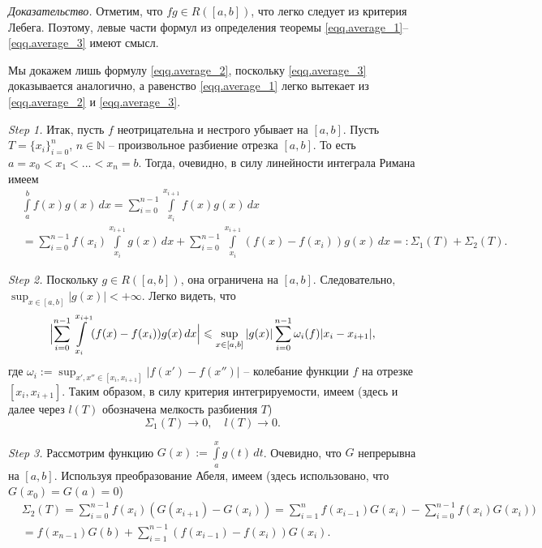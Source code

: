 \textit{Доказательство.} Отметим, что $fg \in R([a,b])$, что легко следует из критерия Лебега. Поэтому, левые части формул из определения теоремы \eqref{eqq.average_1}--\eqref{eqq.average_3} имеют смысл.
    
Мы докажем лишь формулу \eqref{eqq.average_2}, поскольку \eqref{eqq.average_3} доказывается аналогично, а равенство \eqref{eqq.average_1} легко 
вытекает из \eqref{eqq.average_2} и \eqref{eqq.average_3}.

\textit{Step 1.}
Итак, пусть $f$ неотрицательна и нестрого убывает на $[a,b]$. Пусть $T=\{x_{i}\}_{i=0}^{n}$, $n \in \mathbb{N}$ -- произвольное разбиение отрезка $[a,b]$. То есть
$a=x_{0} < x_{1} < ... < x_{n} =b$. Тогда, очевидно, в силу линейности интеграла Римана имеем
\begin{equation}
\begin{split}
\label{eqq.13}
&\int\limits_{a}^{b}f(x)g(x)\,dx = \sum\limits_{i=0}^{n-1}\int\limits_{x_{i}}^{x_{i+1}}f(x)g(x)\,dx\\
&= \sum\limits_{i=0}^{n-1}f(x_{i})\int\limits_{x_{i}}^{x_{i+1}}g(x)\,dx
+\sum\limits_{i=0}^{n-1}\int\limits_{x_{i}}^{x_{i+1}}(f(x)-f(x_{i}))g(x)\,dx =:\Sigma_{1}(T)+\Sigma_{2}(T).
\end{split}
\end{equation}


\textit{Step 2.}
Поскольку $g \in R([a,b])$, она ограничена на $[a,b]$. Следовательно, $\sup_{x \in [a,b]}|g(x)| < +\infty$. Легко видеть, что
$$
\Bigl|\sum\limits_{i=0}^{n-1}\int\limits_{x_{i}}^{x_{i+1}}(f(x)-f(x_{i}))g(x)\,dx\Bigr| \le \sup_{x \in [a,b]}|g(x)|\sum\limits_{i=0}^{n-1}\omega_{i}(f)|x_{i}-x_{i+1}|,
$$
где $\omega_{i}:=\sup_{x',x'' \in [x_{i},x_{i+1}]}|f(x')-f(x'')|$ -- колебание функции $f$ на отрезке $[x_{i},x_{i+1}]$.
Таким образом, в силу критерия интегрируемости, имеем (здесь и далее через $l(T)$ обозначена мелкость разбиения $T$)
\begin{equation}
\label{eqq.th_1}
\Sigma_1(T) \to 0, \quad l(T) \to 0.
\end{equation}

\textit{Step 3.} Рассмотрим функцию $G(x):=\int\limits_{a}^{x}g(t)\,dt$. Очевидно, что $G$ непрерывна на $[a,b]$.
Используя преобразование Абеля, имеем (здесь использовано, что $G(x_{0})=G(a)=0$)
\begin{equation}
\begin{split}
\label{eqq.th_2}
&\Sigma_2(T) = \sum\limits_{i=0}^{n-1}f(x_{i})(G(x_{i+1})-G(x_{i})) = \sum\limits_{i=1}^{n}f(x_{i-1})G(x_{i})-\sum\limits_{i=0}^{n-1}f(x_{i})G(x_{i}))\\ 
&= f(x_{n-1})G(b)+
\sum\limits_{i=1}^{n-1}(f(x_{i-1})-f(x_{i}))G(x_{i}).
\end{split}
\end{equation}

